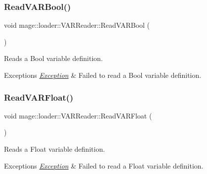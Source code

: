 \hypertarget{classmage_1_1loader_1_1_v_a_r_reader_a2191e47d0806d408145422eb46e32ba1}{}\label{classmage_1_1loader_1_1_v_a_r_reader_a2191e47d0806d408145422eb46e32ba1} 
\subsubsection{\texorpdfstring{Read\+V\+A\+R\+Bool()}{ReadVARBool()}}
{\footnotesize\ttfamily void mage\+::loader\+::\+V\+A\+R\+Reader\+::\+Read\+V\+A\+R\+Bool (\begin{DoxyParamCaption}{ }\end{DoxyParamCaption})\hspace{0.3cm}{\ttfamily [private]}}

Reads a Bool variable definition.


\begin{DoxyExceptions}{Exceptions}
{\em \hyperlink{classmage_1_1_exception}{Exception}} & Failed to read a Bool variable definition. \\
\hline
\end{DoxyExceptions}
\hypertarget{classmage_1_1loader_1_1_v_a_r_reader_a11f2ecdf718d1665a79406e7bebbc6f1}{}\label{classmage_1_1loader_1_1_v_a_r_reader_a11f2ecdf718d1665a79406e7bebbc6f1} 
\subsubsection{\texorpdfstring{Read\+V\+A\+R\+Float()}{ReadVARFloat()}}
{\footnotesize\ttfamily void mage\+::loader\+::\+V\+A\+R\+Reader\+::\+Read\+V\+A\+R\+Float (\begin{DoxyParamCaption}{ }\end{DoxyParamCaption})\hspace{0.3cm}{\ttfamily [private]}}

Reads a Float variable definition.


\begin{DoxyExceptions}{Exceptions}
{\em \hyperlink{classmage_1_1_exception}{Exception}} & Failed to read a Float variable definition. \\
\hline
\end{DoxyExceptions}
\hypertarget{classmage_1_1loader_1_1_v_a_r_reader_ac80f8a30ffc67fc6f048cf32dd43c2e8}{}\label{classmage_1_1loader_1_1_v_a_r_reader_ac80f8a30ffc67fc6f048cf32dd43c2e8} 
